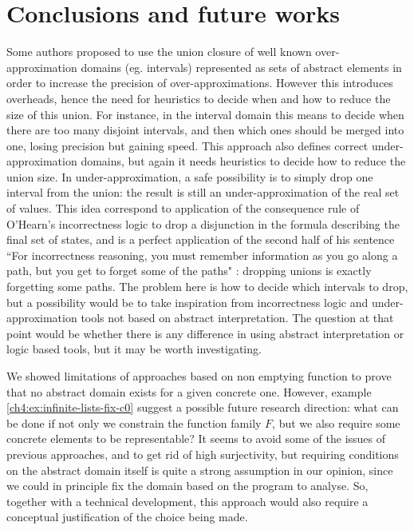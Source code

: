 \chapter{Conclusions and future works}

Some authors proposed  to use the union closure of well known over-approximation domains (eg. intervals) represented as sets of abstract elements in order to increase the precision of over-approximations. However this introduces overheads, hence the need for heuristics to decide when and how to reduce the size of this union. For instance, in the interval domain this means to decide when there are too many disjoint intervals, and then which ones should be merged into one, losing precision but gaining speed.
This approach also defines correct under-approximation domains, but again it needs heuristics to decide how to reduce the union size. In under-approximation, a safe possibility is to simply drop one interval from the union: the result is still an under-approximation of the real set of values. This idea correspond to application of the consequence rule of O'Hearn's incorrectness logic to drop a disjunction in the formula describing the final set of states, and is a perfect application of the second half of his sentence ``For incorrectness reasoning, you must remember information as you go along a path, but you get to forget some of the paths" \cite{ohearn-incorrectness-logic}: dropping unions is exactly forgetting some paths.
The problem here is how to decide which intervals to drop, but a possibility would be to take inspiration from incorrectness logic and under-approximation tools not based on abstract interpretation. The question at that point would be whether there is any difference in using abstract interpretation or logic based tools, but it may be worth investigating.

We showed limitations of approaches based on non emptying function to prove that no abstract domain exists for a given concrete one. However, example \ref{ch4:ex:infinite-lists-fix-c0} suggest a possible future research direction: what can be done if not only we constrain the function family $F$, but we also require some concrete elements to be representable? It seems to avoid some of the issues of previous approaches, and to get rid of high surjectivity, but requiring conditions on the abstract domain itself is quite a strong assumption in our opinion, since we could in principle fix the domain based on the program to analyse. So, together with a technical development, this approach would also require a conceptual justification of the choice being made.

